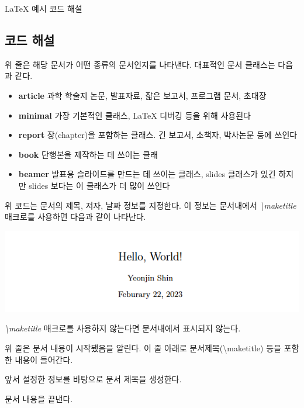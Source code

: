 \documentclass{beamer}
\begin{document}
\begin{frame}[allowframebreaks]{\LaTeX{} 예시 코드 해설}
    \subsection{코드 해설}
    
    위 줄은 해당 문서가 어떤 종류의 문서인지를 나타낸다. 대표적인 문서 클래스는 다음과 같다.
    \begin{itemize}
        \item \textbf{article} 과학 학술지 논문, 발표자료, 잛은 보고서, 프로그램 문서, 초대장 
        \item \textbf{minimal} 가장 기본적인 클래스, \LaTeX{} 디버깅 등을 위해 사용된다
        \item \textbf{report} 장(chapter)을 포함하는 클래스. 긴 보고서, 소책자, 박사논문 등에 쓰인다
        \item \textbf{book} 단행본을 제작하는 데 쓰이는 클래
        \item \textbf{beamer} 발표용 슬라이드를 만드는 데 쓰이는 클래스, slides 클래스가 있긴 하지만 slides 보다는 이 클래스가 더 많이 쓰인다
    \end{itemize}

    \framebreak
    
    위 코드는 문서의 제목, 저자, 날짜 정보를 지정한다. 이 정보는 문서내에서 \emph{\textbackslash maketitle} 매크로를 사용하면 다음과 같이 나타난다.

    \includegraphics[scale=0.9]{images/simple_english_article_title.png}

    \emph{\textbackslash maketitle} 매크로를 사용하지 않는다면 문서내에서 표시되지 않는다.

    \framebreak
    
    위 줄은 문서 내용이 시작됐음을 알린다. 이 줄 아래로 문서제목(\textbackslash maketitle) 등을 포함한 내용이 들어간다.

    
    앞서 설정한 정보를 바탕으로 문서 제목을 생성한다.

    
    문서 내용을 끝낸다.
\end{frame}
\end{document}
